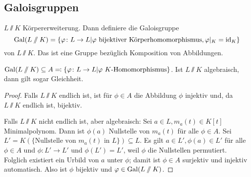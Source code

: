\documentclass[12pt,a4paper]{scrartcl}
\begin{document}
\subsection{Galoisgruppen}
\begin{defi}
	$L\sslash K$ Körpererweiterung. Dann definiere die Galoisgruppe $$\operatorname{Gal}(L\sslash K) = \{\varphi\colon L\to L|\varphi\text{ bijektiver Körperhomomorphismus}, \varphi|_K = \operatorname{id}_K\}$$
	von $L\sslash K$. Das ist eine Gruppe bezüglich Komposition von Abbildungen.
\end{defi}
\begin{lem}\label{lem:20.1}
	$\operatorname{Gal}(L\sslash K)\subseteq  A\eqqcolon\{\varphi\colon L\to L|\varphi\ K\text{-Homomorphismus}\}$. Ist $L\sslash K$ algebraisch, dann gilt sogar Gleichheit.
\end{lem}
\begin{proof}
	Falls $L\sslash K$ endlich ist, ist für $\phi\in A$ die Abbildung $\phi$ injektiv und, da $L\sslash K$ endlich ist, bijektiv.
	
	Falls $L\sslash K$ nicht endlich ist, aber algebraisch: Sei $a\in L, m_a(t)\in K[t]$ Minimalpolynom. Dann ist $\phi(a)$ Nullstelle von $m_a(t)$ für alle $\phi\in A$. Sei $L' = K(\{\text{Nullstelle von }m_a(t)\text{ in }L\})\subseteq L$. Es gilt $a\in L', \phi(a)\in L'$ für alle $\phi \in A$ und $\phi\colon L'\to L'$ und $\phi(L') = L'$, weil $\phi$ die Nullstellen permutiert.
	Folglich existiert ein Urbild von $a$ unter $\phi$; damit ist $\phi\in A$ surjektiv und injektiv automatisch. Also ist $\phi$ bijektiv und $\varphi\in \operatorname{Gal}(L\sslash K)$.
\end{proof}
\end{document}
